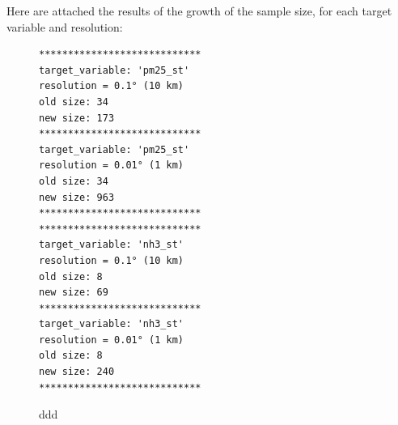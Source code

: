 \pagebreak
Here are attached the results of the growth of the sample size, for each target variable and resolution:
\begin{figure}
\begin{multicols}{2}
\begin{verbatim}
****************************
target_variable: 'pm25_st'
resolution = 0.1° (10 km)
old size: 34
new size: 173 
****************************
target_variable: 'pm25_st'
resolution = 0.01° (1 km)
old size: 34
new size: 963 
****************************
****************************
target_variable: 'nh3_st'
resolution = 0.1° (10 km)
old size: 8
new size: 69 
****************************
target_variable: 'nh3_st'
resolution = 0.01° (1 km)
old size: 8
new size: 240 
****************************
\end{verbatim}
\end{multicols}
\caption{ddd}
\end{figure}

